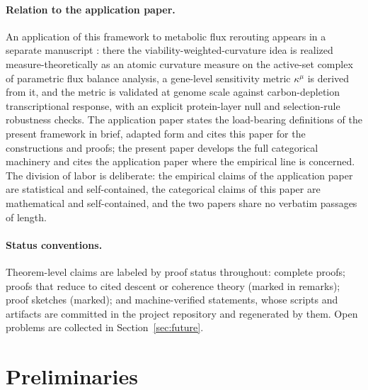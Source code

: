 \documentclass[11pt,a4paper]{article}
\theoremstyle{plain}
\theoremstyle{definition}
\theoremstyle{remark}
\begin{document}
\paragraph{Relation to the application paper.}
An application of this framework to metabolic flux rerouting appears
in a separate manuscript \citep{zai2026measure}: there the
viability-weighted-curvature idea is realized measure-theoretically
as an atomic curvature measure on the active-set complex of
parametric flux balance analysis, a gene-level sensitivity metric
$\kappa^{\mu}$ is derived from it, and the metric is validated at
genome scale against carbon-depletion transcriptional response,
with an explicit protein-layer null and selection-rule robustness
checks. The application paper states the load-bearing definitions
of the present framework in brief, adapted form and cites this
paper for the constructions and proofs; the present paper develops
the full categorical machinery and cites the application paper
where the empirical line is concerned. The division of labor is
deliberate: the empirical claims of the application paper are
statistical and self-contained, the categorical claims of this
paper are mathematical and self-contained, and the two papers share
no verbatim passages of length.

\paragraph{Status conventions.}
Theorem-level claims are labeled by proof status throughout:
complete proofs; proofs that reduce to cited descent or coherence
theory (marked in remarks); proof sketches (marked); and
machine-verified statements, whose scripts and artifacts are
committed in the project repository and regenerated by them. Open
problems are collected in Section~\ref{sec:future}.

\section{Preliminaries}\label{sec:prelim}
\end{document}
